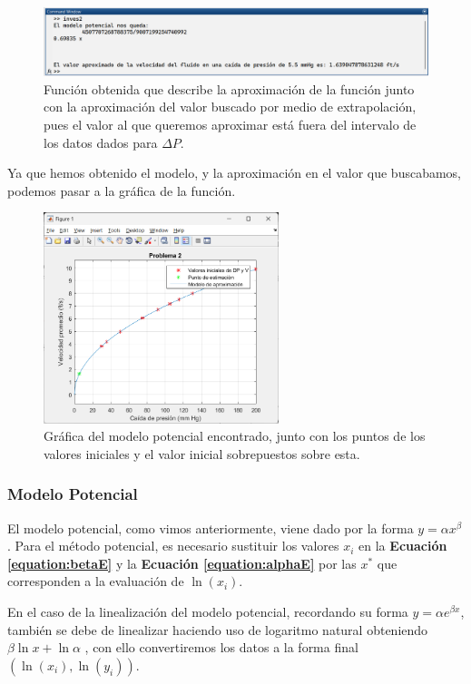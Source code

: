 \documentclass[11pt,letterpaper]{article}
\begin{document}
\begin{figure}[H]
\centering
\includegraphics[width=5in]{res2.png}
\caption{Función obtenida que describe la aproximación de la función junto con la aproximación del valor buscado por medio de extrapolación, pues el valor al que queremos aproximar está fuera del intervalo de los datos dados para $\Delta P$.}
\label{figure:res2}
\end{figure}
Ya que hemos obtenido el modelo, y la aproximación en el valor que buscabamos, podemos pasar a la gráfica de la función.
\begin{figure}[H]
\centering
\includegraphics[width=2.7in]{graf2.png}
\caption{Gráfica del modelo potencial encontrado, junto con los puntos de los valores iniciales y el valor inicial sobrepuestos sobre esta.}
\label{figure:graf2}
\end{figure}
\subsubsection{Modelo Potencial}
El modelo potencial, como vimos anteriormente, viene dado por la forma $y = \alpha x^{\beta}$. Para el método potencial, es necesario sustituir los valores $x_i$ en la \textbf{Ecuación \ref{equation:betaE} } y la \textbf{Ecuación \ref{equation:alphaE}} por las $x^*$ que corresponden a la evaluación de $\ln(x_i)$. \par En el caso de la linealización del modelo potencial, recordando su forma $y = \alpha e^{\beta x}$, también se debe de linealizar haciendo uso de logaritmo natural obteniendo $\beta \ln x + \ln \alpha$ , con ello convertiremos los datos a la forma final $(\ln(x_i), \ln(y_i))$. 
\end{document}
